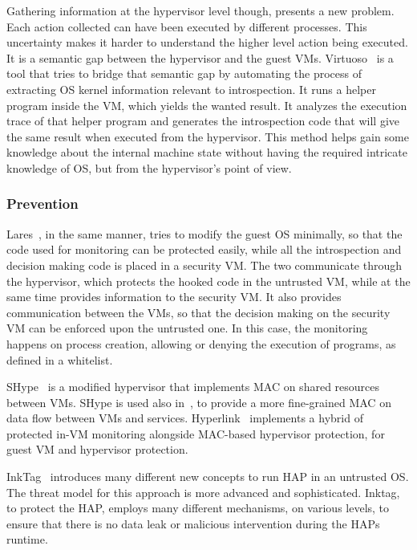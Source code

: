 \par Gathering information at the hypervisor level though, presents a new problem. Each action collected can have been executed by different processes. This uncertainty makes it harder to understand the higher level action being executed. It is a semantic gap between the hypervisor and the guest \ac{VM}s. Virtuoso~\cite{dolan2011virtuoso} is a tool that tries to bridge that semantic gap by automating the process of extracting \ac{OS} kernel information relevant to introspection. It runs a helper program inside the \ac{VM}, which yields the wanted result. It analyzes the execution trace of that helper program and generates the introspection code that will give the same result when executed from the hypervisor. This method helps gain some knowledge about the internal machine state without having the required intricate knowledge of \ac{OS}, but from the hypervisor’s point of view. 

\subsubsection{Prevention}

Lares~\cite{payne2008lares}, in the same manner, tries to modify the guest \ac{OS} minimally, so that the code used for monitoring can be protected easily, while all the introspection and decision making code is placed in a security \ac{VM}. The two communicate through the hypervisor, which protects the hooked code in the untrusted \ac{VM}, while at the same time provides information to the security \ac{VM}. It also provides communication between the \ac{VM}s, so that the decision making on the security \ac{VM} can be enforced upon the untrusted one. In this case, the monitoring happens on process creation, allowing or denying the execution of programs, as defined in a whitelist.

\par SHype~\cite{sailer2005building} is a modified hypervisor that implements \ac{MAC} on shared resources between \ac{VM}s. SHype is used also in~\cite{hay2008forensics}, to provide a more fine-grained \ac{MAC} on data flow between \ac{VM}s and services. Hyperlink~\cite{xiao2016hyperlink} implements a hybrid of protected in-\ac{VM} monitoring alongside \ac{MAC}-based hypervisor protection, for guest \ac{VM} and hypervisor protection.

\par InkTag~\cite{hofmann2013inktag} introduces many different new concepts to run \ac{HAP} in an untrusted \ac{OS}. The threat model for this approach is more advanced and sophisticated. Inktag, to protect the \ac{HAP}, employs many different mechanisms, on various levels, to ensure that there is no data leak or malicious intervention during the \ac{HAP}s runtime. 

